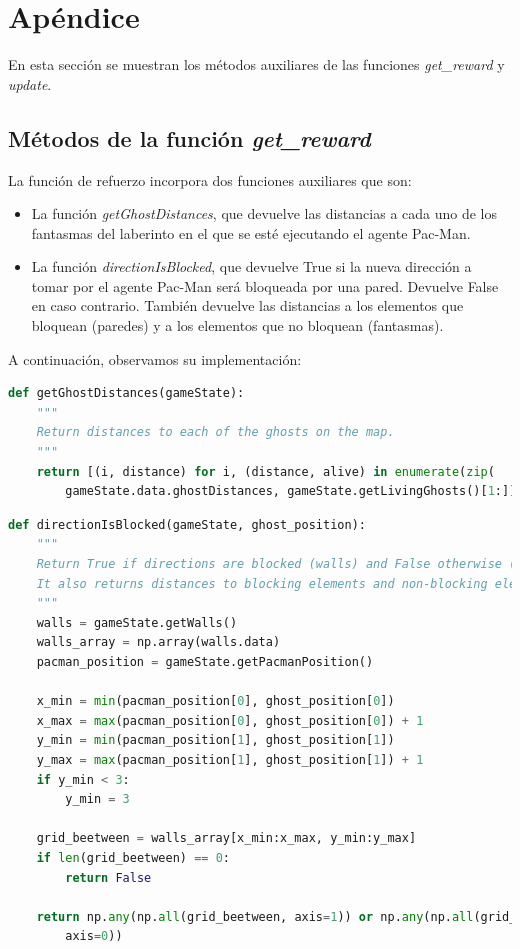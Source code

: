 \documentclass[11pt]{exam}
\begin{document}
\section{Apéndice}\label{apendice}

En esta sección se muestran los métodos auxiliares de las funciones \textit{get\_reward} y \textit{update}.

\subsection{Métodos de la función \textit{get\_reward}}\label{apendice_reward}

La función de refuerzo incorpora dos funciones auxiliares que son:

\begin{itemize}
	\item La función \textit{getGhostDistances}, que devuelve las distancias a cada uno de los fantasmas del laberinto en el que se esté ejecutando el agente Pac-Man.
	\item La función \textit{directionIsBlocked}, que devuelve True si la nueva dirección a tomar por el agente Pac-Man será bloqueada por una pared. Devuelve False en caso contrario. También devuelve las distancias a los elementos que bloquean (paredes) y a los elementos que no bloquean (fantasmas).
\end{itemize}

A continuación, observamos su implementación:
\vspace*{3mm}

\begin{lstlisting}[caption={Función getGhostDistances.}, label={getGhostDistances}, language=python, basicstyle=\footnotesize]
def getGhostDistances(gameState):
	"""
	Return distances to each of the ghosts on the map.
	"""
	return [(i, distance) for i, (distance, alive) in enumerate(zip(
		gameState.data.ghostDistances, gameState.getLivingGhosts()[1:])) if alive]
\end{lstlisting}

\begin{lstlisting}[caption={Función directionIsBlocked.}, label={directionIsBlocked}, language=python, basicstyle=\footnotesize]
def directionIsBlocked(gameState, ghost_position):
	"""
	Return True if directions are blocked (walls) and False otherwise (no walls).
	It also returns distances to blocking elements and non-blocking elements.
	"""
	walls = gameState.getWalls()
	walls_array = np.array(walls.data)
	pacman_position = gameState.getPacmanPosition()
	
	x_min = min(pacman_position[0], ghost_position[0])
	x_max = max(pacman_position[0], ghost_position[0]) + 1
	y_min = min(pacman_position[1], ghost_position[1])
	y_max = max(pacman_position[1], ghost_position[1]) + 1
	if y_min < 3:
		y_min = 3
	
	grid_beetween = walls_array[x_min:x_max, y_min:y_max]
	if len(grid_beetween) == 0:
		return False
	
	return np.any(np.all(grid_beetween, axis=1)) or np.any(np.all(grid_beetween, 
		axis=0))
\end{lstlisting}
\end{document}
